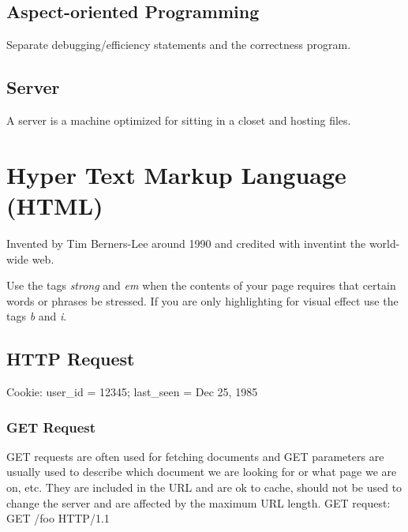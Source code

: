 \documentclass[12pt]{article}
\begin{document}
\subsection{Aspect-oriented Programming}
Separate debugging/efficiency statements and the correctness program.

\subsection*{Server}
A server is a machine optimized for sitting in a closet and hosting files.

\section{Hyper Text Markup Language (HTML)}

Invented by Tim Berners-Lee around 1990 and credited with inventint the world-wide web.

Use the tags \emph{strong} and \emph{em} when the contents of your page requires that certain words or phrases be stressed. If you are only highlighting for visual effect use the tags \emph{b} and \emph{i}.

\subsection{HTTP Request}

\begin{list}{*}{
\setlength{\itemsep}{0pt}
\setlength{\parsep}{0pt}
\setlength{\topsep}{0pt}
\setlength{\partopsep}{0pt}
\setlength{\leftmargin}{2em}
\setlength{\labelwidth}{1.5em}
\setlength{\labelsep}{0.5em}
}
\item Cookie: user\_id = 12345; last\_seen = Dec 25, 1985
\end{list}

\subsubsection{GET Request}

GET requests are often used for fetching documents and GET parameters are usually used to describe which document we are looking for or what page we are on, etc. They are included in the URL and are ok to cache, should not be used to change the server and are affected by the maximum URL length.
GET request: GET /foo HTTP/1.1
\end{document}
